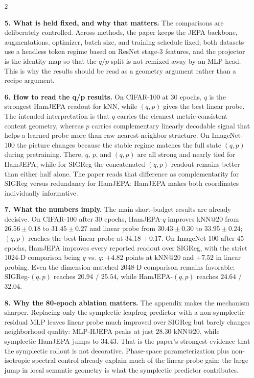 \documentclass[10pt]{article}
\begin{document}
\vspace{0pt}
\begin{multicols}{2}

\textbf{\color{ink}5. What is held fixed, and why that matters.} The comparisons are deliberately controlled. Across methods, the paper keeps the JEPA backbone, augmentations, optimizer, batch size, and training schedule fixed; both datasets use a headless token regime based on ResNet stage-3 features, and the projector is the identity map so that the \(q/p\) split is not remixed away by an MLP head. This is why the results should be read as a geometry argument rather than a recipe argument.

\textbf{\color{ink}6. How to read the q/p results.} On CIFAR-100 at 30 epochs, \(q\) is the strongest HamJEPA readout for kNN, while \((q,p)\) gives the best linear probe. The intended interpretation is that \(q\) carries the cleanest metric-consistent content geometry, whereas \(p\) carries complementary linearly decodable signal that helps a learned probe more than raw nearest-neighbor structure. On ImageNet-100 the picture changes because the stable regime matches the full state \((q,p)\) during pretraining. There, \(q\), \(p\), and \((q,p)\) are all strong and nearly tied for HamJEPA, while for SIGReg the concatenated \((q,p)\) readout remains better than either half alone. The paper reads that difference as complementarity for SIGReg versus redundancy for HamJEPA: HamJEPA makes both coordinates individually informative.

\textbf{\color{ink}7. What the numbers imply.} The main short-budget results are already decisive. On CIFAR-100 after 30 epochs, HamJEPA-\(q\) improves kNN@20 from \(26.56\pm0.18\) to \(31.45\pm0.27\) and linear probe from \(30.43\pm0.30\) to \(33.95\pm0.24\); \((q,p)\) reaches the best linear probe at \(34.18\pm0.17\). On ImageNet-100 after 45 epochs, HamJEPA improves every reported readout over SIGReg, with the strict 1024-D comparison being \(q\) vs. \(q\): \(+4.82\) points at kNN@20 and \(+7.52\) in linear probing. Even the dimension-matched 2048-D comparison remains favorable: SIGReg-\((q,p)\) reaches \(20.94\) / \(25.54\), while HamJEPA-\((q,p)\) reaches \(24.64\) / \(32.04\).

\textbf{\color{ink}8. Why the 80-epoch ablation matters.} The appendix makes the mechanism sharper. Replacing only the symplectic leapfrog predictor with a non-symplectic residual MLP leaves linear probe much improved over SIGReg but barely changes neighborhood quality: MLP-HJEPA peaks at just \(28.30\) kNN@20, while symplectic HamJEPA jumps to \(34.43\). That is the paper's strongest evidence that the symplectic rollout is not decorative. Phase-space parameterization plus non-isotropic spectral control already explain much of the linear-probe gain; the large jump in local semantic geometry is what the symplectic predictor contributes.


\end{multicols}
\end{document}
